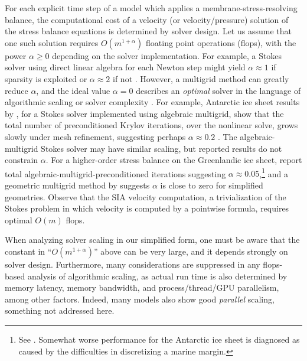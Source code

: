 \documentclass[review]{igs}
\begin{document}
For each explicit time step of a model which applies a membrane-stress-resolving balance, the computational cost of a velocity (or velocity/pressure) solution of the stress balance equations is determined by solver design.  Let us assume that one such solution requires $O(m^{1+\alpha})$ floating point operations (flops),  with the power $\alpha\ge 0$ depending on the solver implementation.  For example, a Stokes solver using direct linear algebra for each Newton step might yield $\alpha \approx 1$ if sparsity is exploited or $\alpha \approx 2$ if not \citep{Bueler2021}.  However, a multigrid method \citep{Trottenbergetal2001} can greatly reduce $\alpha$, and the ideal value $\alpha=0$ describes an \emph{optimal} solver in the language of algorithmic scaling or solver complexity \citep{Bueler2021}.  For example, Antarctic ice sheet results by \cite{IsaacStadlerGhattas2015}, for a Stokes solver implemented using algebraic multigrid, show that the total number of preconditioned Krylov iterations, over the nonlinear solve, grows slowly under mesh refinement, suggesting perhaps $\alpha\approx 0.2$ \citep[Table 8.1]{IsaacStadlerGhattas2015}.  The \cite{Lengetal2012} algebraic-multigrid Stokes solver may have similar scaling, but reported results do not constrain $\alpha$.  For a higher-order stress balance on the Greenlandic ice sheet, \cite{Tuminaroetal2016} report total algebraic-multigrid-preconditioned iterations suggesting $\alpha \approx 0.05$,\footnote{See \citep[Table 7.5]{Tuminaroetal2016}.  Somewhat worse performance for the Antarctic ice sheet is diagnosed as caused by the difficulties in discretizing a marine margin.} and a geometric multigrid method by \citep{BrownSmithAhmadia2013} suggests $\alpha$ is close to zero for simplified geometries.  Observe that the SIA velocity computation, a trivialization of the Stokes problem in which velocity is computed by a pointwise formula, requires optimal $O(m)$ flops.

When analyzing solver scaling in our simplified form, one must be aware that the constant in ``$O(m^{1+\alpha})$'' above can be very large, and it depends strongly on solver design.  Furthermore, many considerations are suppressed in any flops-based analysis of algorithmic scaling, as actual run time is also determined by memory latency, memory bandwidth, and process/thread/GPU parallelism, among other factors.  Indeed, many models \citep[e.g.][]{BrownSmithAhmadia2013, Fischleretal2022, IsaacStadlerGhattas2015, Lengetal2012, Tuminaroetal2016} also show good \emph{parallel} scaling, something not addressed here.
\end{document}
